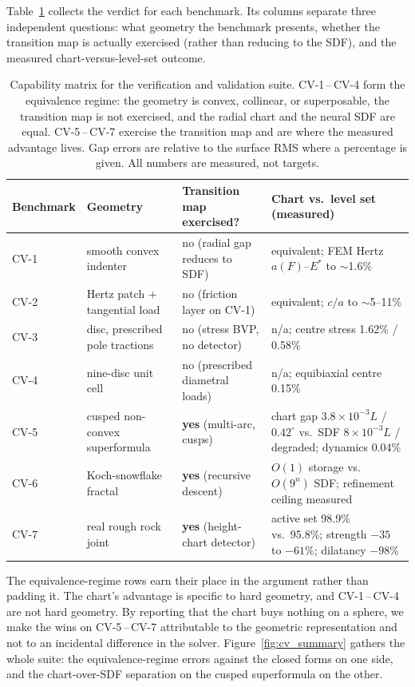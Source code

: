 Table~\ref{tab:capability} collects the verdict for each benchmark. Its columns separate three
independent questions: what geometry the benchmark presents, whether the transition map is actually
exercised (rather than reducing to the SDF), and the measured chart-versus-level-set outcome.

\begin{table}
\centering
\caption{Capability matrix for the verification and validation suite. CV-1\,--\,CV-4 form the
equivalence regime: the geometry is convex, collinear, or superposable, the transition map is not
exercised, and the radial chart and the neural SDF are equal. CV-5\,--\,CV-7 exercise the transition map
and are where the measured advantage lives. Gap errors are relative to the surface RMS where a percentage
is given. All numbers are measured, not targets.}
\label{tab:capability}
\small
\begin{tabular}{@{}llll@{}}
\toprule
Benchmark & Geometry & Transition map exercised? & Chart vs.\ level set (measured) \\
\midrule
CV-1 & smooth convex indenter & no (radial gap reduces to SDF) & equivalent; FEM Hertz $a(F)$--$E^{*}$ to $\sim$1.6\% \\
CV-2 & Hertz patch $+$ tangential load & no (friction layer on CV-1) & equivalent; $c/a$ to $\sim$5--11\% \\
CV-3 & disc, prescribed pole tractions & no (stress BVP, no detector) & n/a; centre stress 1.62\% / 0.58\% \\
CV-4 & nine-disc unit cell & no (prescribed diametral loads) & n/a; equibiaxial centre 0.15\% \\
\midrule
CV-5 & cusped non-convex superformula & \textbf{yes} (multi-arc, cusps) & chart gap $3.8{\times}10^{-3}L$ / $0.42^{\circ}$ vs.\ SDF $8{\times}10^{-3}L$ / degraded; dynamics 0.04\% \\
CV-6 & Koch-snowflake fractal & \textbf{yes} (recursive descent) & $O(1)$ storage vs.\ $O(9^{n})$ SDF; refinement ceiling measured \\
CV-7 & real rough rock joint & \textbf{yes} (height-chart detector) & active set 98.9\% vs.\ 95.8\%; strength $-35$ to $-61$\%; dilatancy $-98$\% \\
\bottomrule
\end{tabular}
\end{table}

The equivalence-regime rows earn their place in the argument rather than padding it. The chart's
advantage is specific to hard geometry, and CV-1\,--\,CV-4 are not hard geometry. By reporting that the
chart buys nothing on a sphere, we make the wins on CV-5\,--\,CV-7 attributable to the geometric
representation and not to an incidental difference in the solver. Figure~\ref{fig:cv_summary} gathers the
whole suite: the equivalence-regime errors against the closed forms on one side, and the chart-over-SDF
separation on the cusped superformula on the other.

